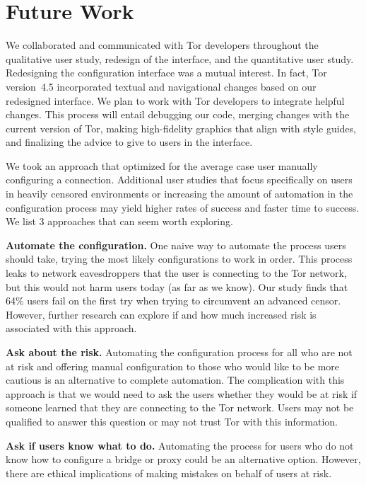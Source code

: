 \documentclass[USenglish,oneside,twocolumn]{article}
\begin{document}
\section{Future Work} 
We collaborated and communicated with Tor developers throughout the qualitative user study, redesign of the interface, and the quantitative user study. Redesigning the configuration interface was a mutual interest. In fact, Tor version~4.5 incorporated textual and navigational changes based on our redesigned interface. We plan to work with Tor developers to integrate helpful changes. This process will entail debugging our code, merging changes with the current version of Tor, making high-fidelity graphics that align with style guides, and finalizing the advice to give to users in the interface. 

We took an approach that optimized for the average case user manually configuring a connection. Additional user studies that focus specifically on users in heavily censored environments or increasing the amount of automation in the configuration process may yield higher rates of success and faster time to success. We list 3 approaches that can seem worth exploring. \\

\begin{description}
\item{\bfseries Automate the configuration.} One naive way to automate the process users should take, trying the most likely configurations to work in order. This process leaks to network eavesdroppers that the user is connecting to the Tor network, but this would not harm users today (as far as we know). Our study finds that 64\% users fail on the first try when trying to circumvent an advanced censor. However, further research can explore if and how much increased risk is associated with this approach. 
\item{\bfseries Ask about the risk.} Automating the configuration process for all who are not at risk and offering manual configuration to those who would like to be more cautious is an alternative to complete automation. The complication with this approach is that we would need to ask the users whether they would be at risk if someone learned that they are connecting to the Tor network. Users may not be qualified to answer this question or may not trust Tor with this information. 
\item{\bfseries Ask if users know what to do.} Automating the process for users who do not know how to configure a bridge or proxy could be an alternative option. However, there are ethical implications of making mistakes on behalf of users at risk.
\end{description}
\end{document}
